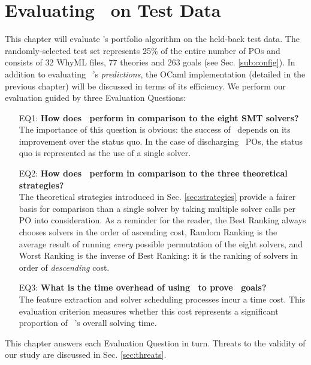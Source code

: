\chapter{Evaluating \where~on Test Data}%
\thispagestyle{nohead}
\label{Evaluation} 

This chapter will evaluate \where's portfolio algorithm on the held-back test data.
The randomly-selected test set represents 25\% of the entire number of POs and consists of 32 WhyML files, 77 theories and 263 goals  (see Sec. \ref{sub:config}).
In addition to evaluating \where~'s \textit{predictions}, the OCaml implementation (detailed in the previous chapter) will be discussed in terms of its efficiency.   
We perform our evaluation guided by three Evaluation Questions:
\begin{itemize}
	\item[EQ1:] \textbf{How does \where~perform in comparison to the eight SMT solvers?}\\
	The importance of this question is obvious: the success of \where~depends on its improvement over the status quo. In the case of discharging \why~POs, the status quo is represented as the use of a single solver.
	\item[EQ2:] \textbf{How does \where~perform in comparison to the three theoretical strategies?}\\
	The theoretical strategies introduced in Sec. \ref{sec:strategies} provide a fairer basis for comparison than a single solver by taking multiple solver calls per PO into consideration.
	As a reminder for the reader, the \textsf{Best Ranking} always chooses solvers in the order of ascending cost, \textsf{Random Ranking} is the average result of running \textit{every} possible permutation of the eight solvers, and \textsf{Worst Ranking} is the inverse of \textsf{Best Ranking}: it is the ranking of solvers in order of \textit{descending} cost. 
	\item[EQ3:] \textbf{What is the time overhead of using \where~to prove \why~goals?}\\
	The feature extraction and solver scheduling processes incur a time cost. This evaluation criterion measures whether this cost represents a significant proportion of \where~'s overall solving time.    	
\end{itemize}
This chapter answers each Evaluation Question in turn.
Threats to the validity of our study are discussed in Sec. \ref{sec:threats}. 

